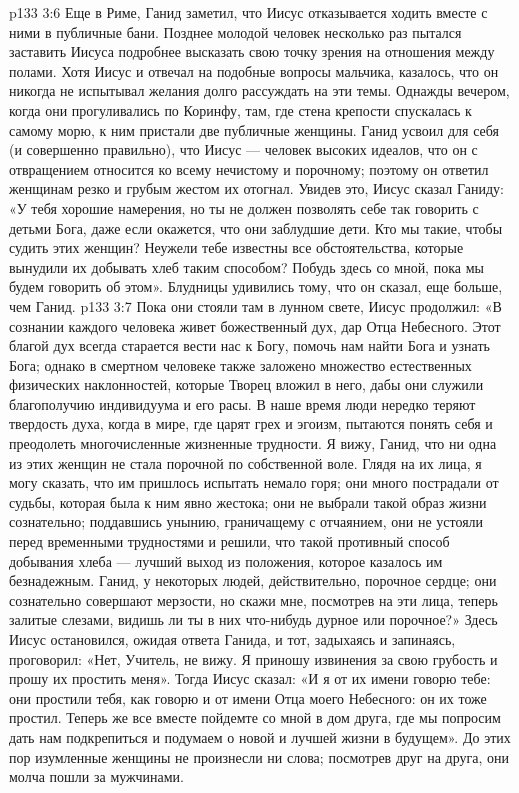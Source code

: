 \vs p133 3:6 Еще в Риме, Ганид заметил, что Иисус отказывается ходить вместе с ними в публичные бани. Позднее молодой человек несколько раз пытался заставить Иисуса подробнее высказать свою точку зрения на отношения между полами. Хотя Иисус и отвечал на подобные вопросы мальчика, казалось, что он никогда не испытывал желания долго рассуждать на эти темы. Однажды вечером, когда они прогуливались по Коринфу, там, где стена крепости спускалась к самому морю, к ним пристали две публичные женщины. Ганид усвоил для себя (и совершенно правильно), что Иисус --- человек высоких идеалов, что он с отвращением относится ко всему нечистому и порочному; поэтому он ответил женщинам резко и грубым жестом их отогнал. Увидев это, Иисус сказал Ганиду: «У тебя хорошие намерения, но ты не должен позволять себе так говорить с детьми Бога, даже если окажется, что они заблудшие дети. Кто мы такие, чтобы судить этих женщин? Неужели тебе известны все обстоятельства, которые вынудили их добывать хлеб таким способом? Побудь здесь со мной, пока мы будем говорить об этом». Блудницы удивились тому, что он сказал, еще больше, чем Ганид.
\vs p133 3:7 Пока они стояли там в лунном свете, Иисус продолжил: «В сознании каждого человека живет божественный дух, дар Отца Небесного. Этот благой дух всегда старается вести нас к Богу, помочь нам найти Бога и узнать Бога; однако в смертном человеке также заложено множество естественных физических наклонностей, которые Творец вложил в него, дабы они служили благополучию индивидуума и его расы. В наше время люди нередко теряют твердость духа, когда в мире, где царят грех и эгоизм, пытаются понять себя и преодолеть многочисленные жизненные трудности. Я вижу, Ганид, что ни одна из этих женщин не стала порочной по собственной воле. Глядя на их лица, я могу сказать, что им пришлось испытать немало горя; они много пострадали от судьбы, которая была к ним явно жестока; они не выбрали такой образ жизни сознательно; поддавшись унынию, граничащему с отчаянием, они не устояли перед временными трудностями и решили, что такой противный способ добывания хлеба --- лучший выход из положения, которое казалось им безнадежным. Ганид, у некоторых людей, действительно, порочное сердце; они сознательно совершают мерзости, но скажи мне, посмотрев на эти лица, теперь залитые слезами, видишь ли ты в них что\hyp{}нибудь дурное или порочное?» Здесь Иисус остановился, ожидая ответа Ганида, и тот, задыхаясь и запинаясь, проговорил: «Нет, Учитель, не вижу. Я приношу извинения за свою грубость и прошу их простить меня». Тогда Иисус сказал: «И я от их имени говорю тебе: они простили тебя, как говорю и от имени Отца моего Небесного: он их тоже простил. Теперь же все вместе пойдемте со мной в дом друга, где мы попросим дать нам подкрепиться и подумаем о новой и лучшей жизни в будущем». До этих пор изумленные женщины не произнесли ни слова; посмотрев друг на друга, они молча пошли за мужчинами.
